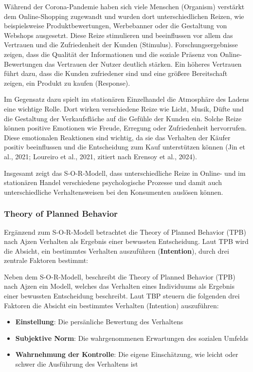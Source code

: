 Während der Corona-Pandemie haben sich viele Menschen (Organism) verstärkt dem Online-Shopping zugewandt und wurden dort unterschiedlichen Reizen, wie beispielsweise Produktbewertungen, Werbebanner oder die Gestaltung von Webshops ausgesetzt. Diese Reize stimulieren und beeinflussen vor allem das Vertrauen und die Zufriedenheit der Kunden (Stimulus). Forschungsergebnisse zeigen, dass die Qualität der Informationen und die soziale Präsenz von Online-Bewertungen das Vertrauen der Nutzer deutlich stärken. Ein höheres Vertrauen führt dazu, dass die Kunden zufriedener sind und eine größere Bereitschaft zeigen, ein Produkt zu kaufen (Response).

Im Gegensatz dazu spielt im stationären Einzelhandel die Atmosphäre des Ladens eine wichtige Rolle. Dort wirken verschiedene Reize wie Licht, Musik, Düfte und die Gestaltung der Verkaufsfläche auf die Gefühle der Kunden ein. Solche Reize können positive Emotionen wie Freude, Erregung oder Zufriedenheit hervorrufen. Diese emotionalen Reaktionen sind wichtig, da sie das Verhalten der Käufer positiv beeinflussen und die Entscheidung zum Kauf unterstützen können (Jin et al., 2021; Loureiro et al., 2021, zitiert nach Erensoy et al., 2024).  

Insgesamt zeigt das S-O-R-Modell, dass unterschiedliche Reize in Online- und im stationären Handel verschiedene psychologische Prozesse und damit auch unterschiedliche Verhaltensweisen bei den Konsumenten auslösen können. 

\subsubsection{Theory of Planned Behavior}
Ergänzend zum S-O-R-Modell betrachtet die Theory of Planned Behavior (TPB) nach Ajzen Verhalten als Ergebnis einer bewussten Entscheidung. Laut TPB wird die Absicht, ein bestimmtes Verhalten auszuführen (\textbf{Intention}), durch drei zentrale Faktoren bestimmt:

Neben dem S-O-R-Modell, beschreibt die Theory of Planned Behavior (TPB) nach Ajzen ein Modell, welches das Verhalten eines Individuums als Ergebnis einer bewussten Entscheidung beschreibt. Laut TBP steuern die folgenden drei Faktoren die Absicht ein bestimmtes Verhalten (Intention) auszuführen:
\begin{itemize}
    \item \textbf{Einstellung}: Die persänliche Bewertung des Verhaltens
    \item \textbf{Subjektive Norm}: Die wahrgenommenen Erwartungen des sozialen Umfelds
    \item \textbf{Wahrnehmung der Kontrolle}: Die eigene Einschätzung, wie leicht oder schwer die Ausführung des Verhaltens ist
\end{itemize}

